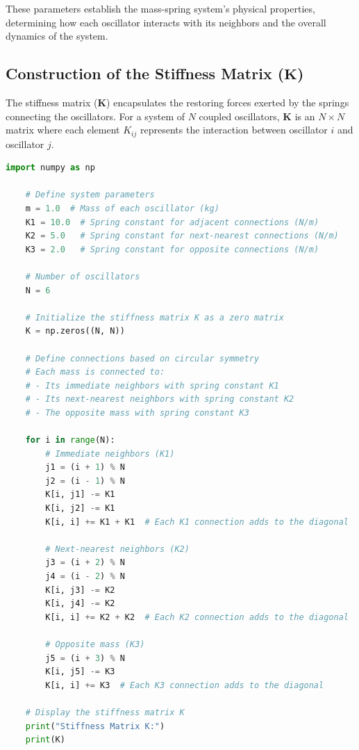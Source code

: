 \documentclass[12pt]{report} %
\begin{document}
    These parameters establish the mass-spring system's physical properties, determining how each oscillator interacts with its neighbors and the overall dynamics of the system.
    
    \subsection{Construction of the Stiffness Matrix (\( \mathbf{K} \))}
    \label{subsec:part2_task1_K_matrix}
    
    The stiffness matrix (\( \mathbf{K} \)) encapsulates the restoring forces exerted by the springs connecting the oscillators. For a system of \( N \) coupled oscillators, \( \mathbf{K} \) is an \( N \times N \) matrix where each element \( K_{ij} \) represents the interaction between oscillator \( i \) and oscillator \( j \).
    
    \begin{lstlisting}[language=Python, caption={Constructing the Stiffness Matrix \( \mathbf{K} \)}, label={lst:K_matrix_task2}]
    import numpy as np

    # Define system parameters
    m = 1.0  # Mass of each oscillator (kg)
    K1 = 10.0  # Spring constant for adjacent connections (N/m)
    K2 = 5.0   # Spring constant for next-nearest connections (N/m)
    K3 = 2.0   # Spring constant for opposite connections (N/m)
    
    # Number of oscillators
    N = 6
    
    # Initialize the stiffness matrix K as a zero matrix
    K = np.zeros((N, N))
    
    # Define connections based on circular symmetry
    # Each mass is connected to:
    # - Its immediate neighbors with spring constant K1
    # - Its next-nearest neighbors with spring constant K2
    # - The opposite mass with spring constant K3
    
    for i in range(N):
        # Immediate neighbors (K1)
        j1 = (i + 1) % N
        j2 = (i - 1) % N
        K[i, j1] -= K1
        K[i, j2] -= K1
        K[i, i] += K1 + K1  # Each K1 connection adds to the diagonal
        
        # Next-nearest neighbors (K2)
        j3 = (i + 2) % N
        j4 = (i - 2) % N
        K[i, j3] -= K2
        K[i, j4] -= K2
        K[i, i] += K2 + K2  # Each K2 connection adds to the diagonal
        
        # Opposite mass (K3)
        j5 = (i + 3) % N
        K[i, j5] -= K3
        K[i, i] += K3  # Each K3 connection adds to the diagonal
    
    # Display the stiffness matrix K
    print("Stiffness Matrix K:")
    print(K)
    \end{lstlisting}
    
\end{document}
